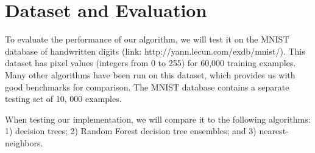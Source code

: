 \documentclass[10pt]{article}
\begin{document}
\section{Dataset and Evaluation}
To evaluate the performance of our algorithm, we will test it on the MNIST database of handwritten digits (link: http://yann.lecun.com/exdb/mnist/). This dataset has pixel values (integers from 0 to 255) for 60,000 training examples. Many other algorithms have been run on this dataset, which provides us with good benchmarks for comparison. The MNIST database contains a separate testing set of 10, 000 examples.

When testing our implementation, we will compare it to the following algorithms:  1) decision trees; 2) Random Forest decision tree ensembles; and 3) nearest-neighbors.
	
\end{document}
